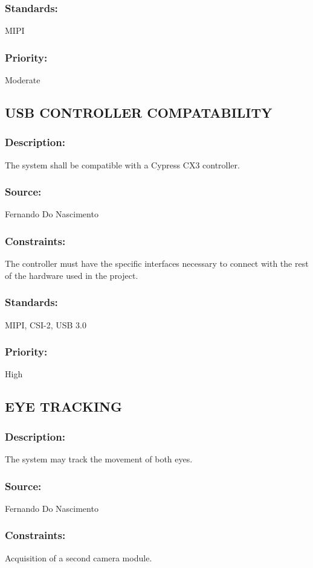 \subsubsection{Standards:} 
	{MIPI}
\subsubsection{Priority:} 
	{Moderate}

\subsection{\text USB CONTROLLER COMPATABILITY}
\subsubsection{Description:} 
	{The system shall be compatible with a Cypress CX3 controller.}
\subsubsection{Source:} 
	{Fernando Do Nascimento}
\subsubsection{Constraints:} 
	{The controller must have the specific interfaces necessary to connect with the rest of the hardware used in the project.}
\subsubsection{Standards:} 
	{MIPI, CSI-2, USB 3.0}
\subsubsection{Priority:} 
	{High}

\subsection{\text EYE TRACKING}
\subsubsection{Description:} 
	{The system may track the movement of both eyes.}
\subsubsection{Source:} 
	{Fernando Do Nascimento}
\subsubsection{Constraints:} 
	{Acquisition of a second camera module.}
